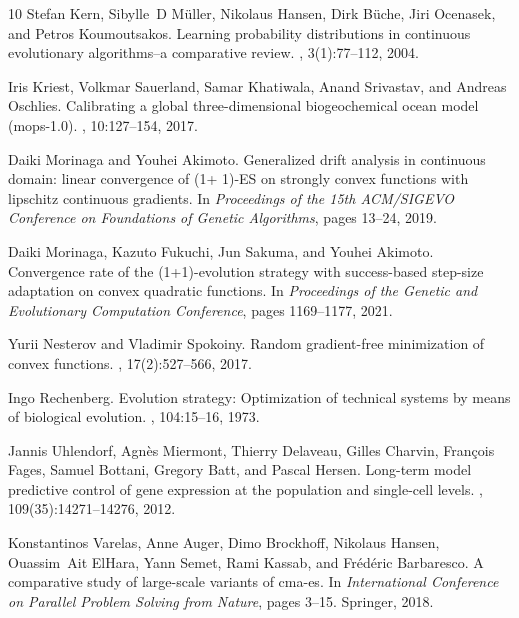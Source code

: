 \documentclass[journal]{IEEEtran}
\theoremstyle{definition}
\begin{document}
\begin{thebibliography}{10}
Stefan Kern, Sibylle~D M{\"u}ller, Nikolaus Hansen, Dirk B{\"u}che, Jiri
  Ocenasek, and Petros Koumoutsakos.
\newblock Learning probability distributions in continuous evolutionary
  algorithms--a comparative review.
, 3(1):77--112, 2004.

Iris Kriest, Volkmar Sauerland, Samar Khatiwala, Anand Srivastav, and Andreas
  Oschlies.
\newblock Calibrating a global three-dimensional biogeochemical ocean model
  (mops-1.0).
, 10:127--154, 2017.

Daiki Morinaga and Youhei Akimoto.
\newblock Generalized drift analysis in continuous domain: linear convergence
  of {(1+ 1)-ES} on strongly convex functions with lipschitz continuous
  gradients.
\newblock In {\em Proceedings of the 15th ACM/SIGEVO Conference on Foundations
  of Genetic Algorithms}, pages 13--24, 2019.

Daiki Morinaga, Kazuto Fukuchi, Jun Sakuma, and Youhei Akimoto.
\newblock Convergence rate of the {(1+1)}-evolution strategy with success-based
  step-size adaptation on convex quadratic functions.
\newblock In {\em Proceedings of the Genetic and Evolutionary Computation
  Conference}, pages 1169--1177, 2021.

Yurii Nesterov and Vladimir Spokoiny.
\newblock Random gradient-free minimization of convex functions.
, 17(2):527--566, 2017.

Ingo Rechenberg.
\newblock Evolution strategy: Optimization of technical systems by means of
  biological evolution.
, 104:15--16, 1973.

Jannis Uhlendorf, Agn{\`e}s Miermont, Thierry Delaveau, Gilles Charvin,
  Fran{\c{c}}ois Fages, Samuel Bottani, Gregory Batt, and Pascal Hersen.
\newblock Long-term model predictive control of gene expression at the
  population and single-cell levels.
,
  109(35):14271--14276, 2012.

Konstantinos Varelas, Anne Auger, Dimo Brockhoff, Nikolaus Hansen, Ouassim~Ait
  ElHara, Yann Semet, Rami Kassab, and Fr{\'e}d{\'e}ric Barbaresco.
\newblock A comparative study of large-scale variants of cma-es.
\newblock In {\em International Conference on Parallel Problem Solving from
  Nature}, pages 3--15. Springer, 2018.

\end{thebibliography}
\end{document}
